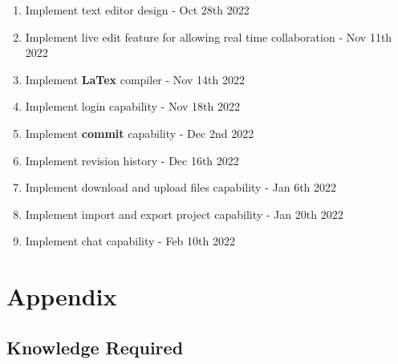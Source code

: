 \documentclass[12pt, titlepage]{article}
\begin{document}
	\begin{enumerate}
		\item Implement text editor design - Oct 28th 2022
		\item Implement live edit feature for allowing real time collaboration - Nov 11th 2022
		\item Implement \textbf{LaTex} compiler - Nov 14th 2022
		\item Implement login capability - Nov 18th 2022
		\item Implement \textbf{commit} capability - Dec 2nd 2022
		\item Implement revision history - Dec 16th 2022
		\item Implement download and upload files capability - Jan 6th 2022
		\item Implement import and export project capability - Jan 20th 2022
		\item Implement chat capability - Feb 10th 2022
	\end{enumerate}
	
	\newpage
	
	\section{Appendix}
	
	\subsection{Knowledge Required}
	
\end{document}
